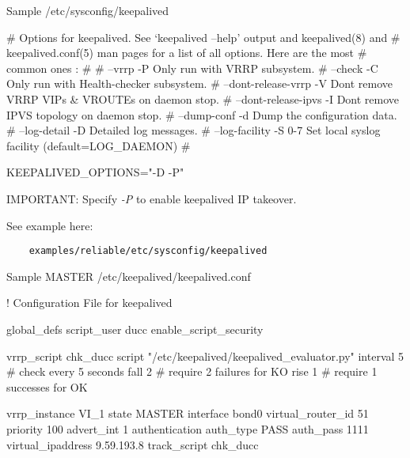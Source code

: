 \begin{minipage}{\textwidth}

	Sample /etc/sysconfig/keepalived\\

	\begin{greybatim}
	
# Options for keepalived. See `keepalived --help' output and keepalived(8) and
# keepalived.conf(5) man pages for a list of all options. Here are the most
# common ones :
#
# --vrrp               -P    Only run with VRRP subsystem.
# --check              -C    Only run with Health-checker subsystem.
# --dont-release-vrrp  -V    Dont remove VRRP VIPs & VROUTEs on daemon stop.
# --dont-release-ipvs  -I    Dont remove IPVS topology on daemon stop.
# --dump-conf          -d    Dump the configuration data.
# --log-detail         -D    Detailed log messages.
# --log-facility       -S    0-7 Set local syslog facility (default=LOG_DAEMON)
#

KEEPALIVED_OPTIONS="-D -P"

	\end{greybatim}
	
	\medskip
	IMPORTANT: Specify {\em -P} to enable keepalived IP takeover.
	
	\medskip
	See example here:
	\begin{verbatim}
    examples/reliable/etc/sysconfig/keepalived
   	\end{verbatim}
	
\end{minipage}

\begin{minipage}{\textwidth}

	Sample MASTER /etc/keepalived/keepalived.conf\\
	
	\begin{greybatim}
	
! Configuration File for keepalived

global_defs {
	script_user ducc 
	enable_script_security
}

vrrp_script chk_ducc {
  script       "/etc/keepalived/keepalived_evaluator.py"
  interval 5   # check every 5 seconds
  fall 2       # require 2 failures for KO
  rise 1       # require 1 successes for OK
}

vrrp_instance VI_1 {
    state MASTER
    interface bond0
    virtual_router_id 51
    priority 100
    advert_int 1
    authentication {
        auth_type PASS
        auth_pass 1111
    }
    virtual_ipaddress {
        9.59.193.8
    }
    track_script {
    	chk_ducc
  	}
}

   	\end{greybatim}

\end{minipage}

